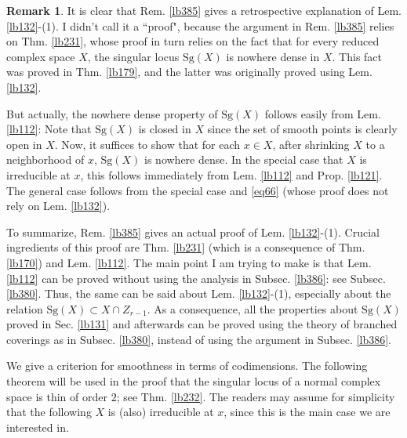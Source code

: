 \documentclass[12pt,b5paper,notitlepage]{report}
\theoremstyle{definition}
\newtheorem{rem}[df]{Remark}
\theoremstyle{plain}
\newcommand{\Sg}{\mathrm{Sg}}
\numberwithin{equation}{section}
\begin{document}
\begin{rem}
It is clear that Rem. \ref{lb385} gives a retrospective explanation of Lem. \ref{lb132}-(1). I didn't call it a ``proof", because the argument in Rem. \ref{lb385} relies on Thm. \ref{lb231}, whose proof in turn relies on the fact that for every reduced complex space $X$, the singular locus $\Sg(X)$ is nowhere dense in $X$. This fact was proved in Thm. \ref{lb179}, and the latter was originally proved using Lem. \ref{lb132}.

But actually, the nowhere dense property of $\Sg(X)$ follows easily from Lem. \ref{lb112}: Note that $\Sg(X)$ is closed in $X$ since the set of smooth points is clearly open in $X$. Now, it suffices to show that for each $x\in X$, after shrinking $X$ to a neighborhood of $x$, $\Sg(X)$ is nowhere dense. In the special case that $X$ is irreducible at $x$, this follows immediately from Lem. \ref{lb112} and  Prop. \ref{lb121}. The general case follows from the special case and \eqref{eq66} (whose proof does not rely on Lem. \ref{lb132}).

To summarize, Rem. \ref{lb385} gives an actual proof of Lem. \ref{lb132}-(1). Crucial ingredients of this proof are Thm. \ref{lb231} (which is a consequence of Thm. \ref{lb170}) and Lem. \ref{lb112}. The main point I am trying to make is that Lem. \ref{lb112} can be proved without using the analysis in Subsec. \ref{lb386}: see Subsec. \ref{lb380}. Thus, the same can be said about Lem. \ref{lb132}-(1), especially about the relation $\Sg(X)\subset X\cap Z_{r-1}$. As a consequence, all the properties about $\Sg(X)$ proved in Sec. \ref{lb131} and afterwards can be proved using the theory of branched coverings as in Subsec. \ref{lb380}, instead of using the argument in Subsec. \ref{lb386}.  \hfill\qedsymbol
\end{rem}




We give a criterion for smoothness in terms of codimensions. The following theorem will be used in the proof that the singular locus of a normal complex space is thin of order $2$; see Thm. \ref{lb232}. The readers may assume for simplicity that the following $X$ is (also) irreducible at $x$, since this is the main case we are interested in.
\end{document}
